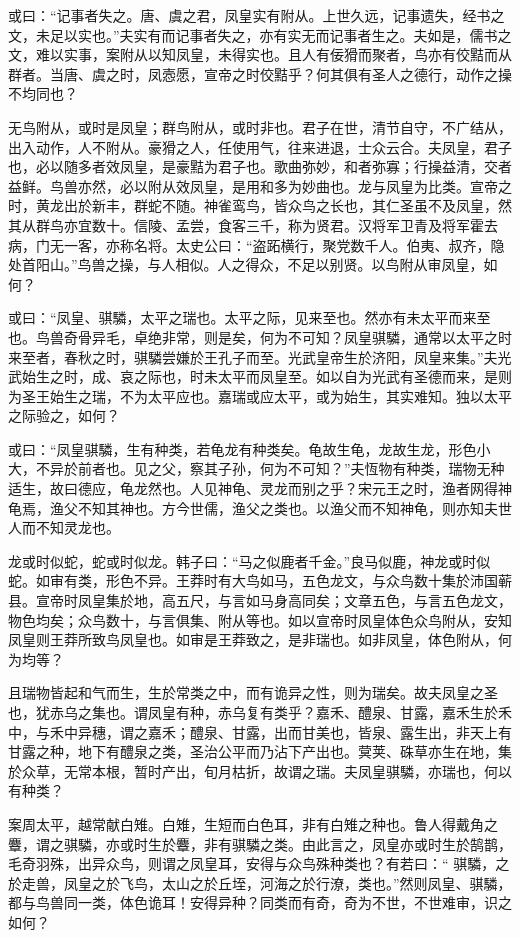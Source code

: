 \documentclass[]{article}
\begin{document}
或曰：``记事者失之。唐、虞之君，凤皇实有附从。上世久远，记事遗失，经书之文，未足以实也。''夫实有而记事者失之，亦有实无而记事者生之。夫如是，儒书之文，难以实事，案附从以知凤皇，未得实也。且人有佞猾而聚者，鸟亦有佼黠而从群者。当唐、虞之时，凤悫愿，宣帝之时佼黠乎？何其俱有圣人之德行，动作之操不均同也？

无鸟附从，或时是凤皇；群鸟附从，或时非也。君子在世，清节自守，不广结从，出入动作，人不附从。豪猾之人，任使用气，往来进退，士众云合。夫凤皇，君子也，必以随多者效凤皇，是豪黠为君子也。歌曲弥妙，和者弥寡；行操益清，交者益鲜。鸟兽亦然，必以附从效凤皇，是用和多为妙曲也。龙与凤皇为比类。宣帝之时，黄龙出於新丰，群蛇不随。神雀鸾鸟，皆众鸟之长也，其仁圣虽不及凤皇，然其从群鸟亦宜数十。信陵、孟尝，食客三千，称为贤君。汉将军卫青及将军霍去病，门无一客，亦称名将。太史公曰：``盗跖横行，聚党数千人。伯夷、叔齐，隐处首阳山。''鸟兽之操，与人相似。人之得众，不足以别贤。以鸟附从审凤皇，如何？

或曰：``凤皇、骐驎，太平之瑞也。太平之际，见来至也。然亦有未太平而来至也。鸟兽奇骨异毛，卓绝非常，则是矣，何为不可知？凤皇骐驎，通常以太平之时来至者，春秋之时，骐驎尝嫌於王孔子而至。光武皇帝生於济阳，凤皇来集。''夫光武始生之时，成、哀之际也，时未太平而凤皇至。如以自为光武有圣德而来，是则为圣王始生之瑞，不为太平应也。嘉瑞或应太平，或为始生，其实难知。独以太平之际验之，如何？

或曰：``凤皇骐驎，生有种类，若龟龙有种类矣。龟故生龟，龙故生龙，形色小大，不异於前者也。见之父，察其子孙，何为不可知？''夫恆物有种类，瑞物无种适生，故曰德应，龟龙然也。人见神龟、灵龙而别之乎？宋元王之时，渔者网得神龟焉，渔父不知其神也。方今世儒，渔父之类也。以渔父而不知神龟，则亦知夫世人而不知灵龙也。

龙或时似蛇，蛇或时似龙。韩子曰：``马之似鹿者千金。''良马似鹿，神龙或时似蛇。如审有类，形色不异。王莽时有大鸟如马，五色龙文，与众鸟数十集於沛国蕲县。宣帝时凤皇集於地，高五尺，与言如马身高同矣；文章五色，与言五色龙文，物色均矣；众鸟数十，与言俱集、附从等也。如以宣帝时凤皇体色众鸟附从，安知凤皇则王莽所致鸟凤皇也。如审是王莽致之，是非瑞也。如非凤皇，体色附从，何为均等？

且瑞物皆起和气而生，生於常类之中，而有诡异之性，则为瑞矣。故夫凤皇之圣也，犹赤乌之集也。谓凤皇有种，赤乌复有类乎？嘉禾、醴泉、甘露，嘉禾生於禾中，与禾中异穗，谓之嘉禾；醴泉、甘露，出而甘美也，皆泉、露生出，非天上有甘露之种，地下有醴泉之类，圣治公平而乃沾下产出也。蓂荚、硃草亦生在地，集於众草，无常本根，暂时产出，旬月枯折，故谓之瑞。夫凤皇骐驎，亦瑞也，何以有种类？

案周太平，越常献白雉。白雉，生短而白色耳，非有白雉之种也。鲁人得戴角之麞，谓之骐驎，亦或时生於麞，非有骐驎之类。由此言之，凤皇亦或时生於鹄鹊，毛奇羽殊，出异众鸟，则谓之凤皇耳，安得与众鸟殊种类也？有若曰：``
骐驎，之於走兽，凤皇之於飞鸟，太山之於丘垤，河海之於行潦，类也。''然则凤皇、骐驎，都与鸟兽同一类，体色诡耳！安得异种？同类而有奇，奇为不世，不世难审，识之如何？
\end{document}
